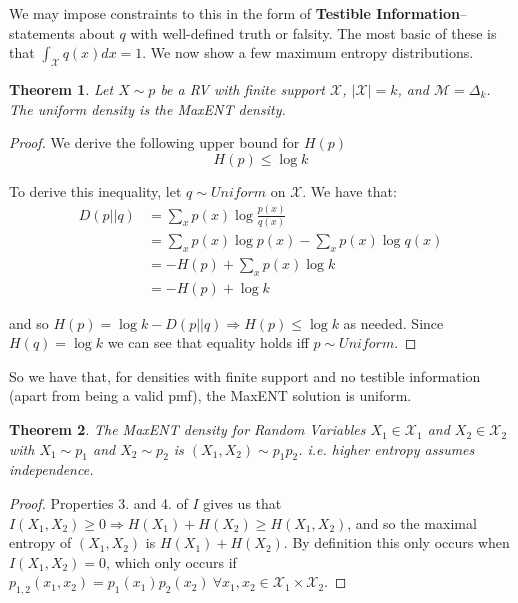 \documentclass[]{article}
\theoremstyle{mattstyle}
\newtheorem{theorem}{Theorem}[section]
\theoremstyle{definition}
\begin{document}
We may impose constraints to this in the form of \textbf{Testible Information}-- statements about $q$ with well-defined truth or falsity. The most basic of these is that $\int_{\mathcal{X}}^{} q(x)dx = 1$. We now show a few maximum entropy distributions. 

\newpage

\begin{theorem}\label{th:unifentlim}
	Let $X\sim p$ be a RV with finite support $\mathcal{X}$, $|\mathcal{X}|=k$, and $\mathcal{M} = \Delta_{k}$. The uniform density is the MaxENT density.
\end{theorem}

\begin{proof}
	We derive the following upper bound for \(H(p)\)
	\begin{equation}
	H(p) \le \log k
	\end{equation}
	
	To derive this inequality, let \(q\sim Uniform\) on $\mathcal{X}$. We have that:
	\begin{align*}
	D(p||q)&=\sum_{x}p(x)\log\frac{p(x)}{q(x)}\\
	&=\sum_{x}p(x)\log p(x)-\sum_xp(x)\log q(x)\\
	&= -H(p) + \sum_xp(x)\log k \\
	&= -H(p) + \log k
	\end{align*}
	
	and so \(H(p)=\log k-D(p||q) \Rightarrow H(p) \le \log k \) as needed. Since $H(q) = \log k$ we can see that equality holds iff $p \sim Uniform$.
\end{proof}

So we have that, for densities with finite support and no testible information (apart from being a valid pmf), the MaxENT solution is uniform.


\begin{theorem}
	The MaxENT density for Random Variables $X_1 \in \mathcal{X}_1$ and $X_2 \in \mathcal{X}_2$ with $X_1 \sim p_1$ and $X_2 \sim p_2$ is \( (X_1,X_2)\sim p_1p_2 \). i.e. higher entropy assumes independence.
\end{theorem}

\begin{proof}
	Properties 3. and 4. of $I$ gives us that \(I(X_1,X_2)\ge0 \Rightarrow H(X_1) + H(X_2) \ge H(X_1,X_2) \), and so the maximal entropy of \((X_1,X_2)\) is \(H(X_1) + H(X_2)\). By definition this only occurs when \(I(X_1,X_2)=0\), which only occurs if
	\(p_{1,2}(x_1,x_2)=p_1(x_1)p_2(x_2) \ \forall x_1,x_2 \in \mathcal{X}_1\times\mathcal{X}_2\).
\end{proof}
\end{document}
